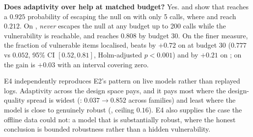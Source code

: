 {\bf Does adaptivity over \families help at matched budget?} Yes.
 and  show that \thompson reaches a $0.925$
probability of escaping the null on \qwenseven with only 5 calls, where \staticpone and \roundrobin
reach $0.212$. On \phimini, \staticpone \emph{never} escapes the null at any budget up to 200 calls
while the vulnerability is reachable, and \thompson reaches $0.808$ by budget 30. On the finer
measure, the fraction of vulnerable items localised, \thompson beats \roundrobin by $+0.72$ on
\qwenseven at budget 30 ($0.777$ vs $0.052$, 95\% CI $[0.52, 0.81]$, Holm-adjusted $p<0.001$) and
by $+0.21$ on \qwensmall; on \phimini the gain is $+0.03$ with an interval covering zero.

E4 independently reproduces E2's pattern on live models rather than replayed logs. Adaptivity
across the design space pays, and it pays most where the design-quality spread is widest
(\qwenseven: $0.037 \to 0.852$ across families) and least where the model is close to genuinely
robust (\phimini, ceiling $0.16$). E4 also supplies the case the offline data could not: a model
that is substantially robust, where the honest conclusion is bounded robustness rather than a
hidden vulnerability.
